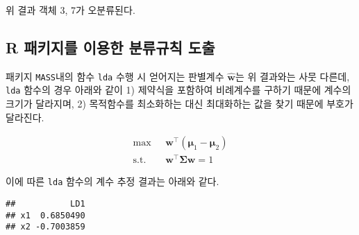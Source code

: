 \documentclass[]{book}
\newenvironment{Shaded}{\begin{snugshade}}{\end{snugshade}}
\newcommand{\KeywordTok}[1]{\textcolor[rgb]{0.13,0.29,0.53}{\textbf{#1}}}
\newcommand{\NormalTok}[1]{#1}
\newcommand{\OperatorTok}[1]{\textcolor[rgb]{0.81,0.36,0.00}{\textbf{#1}}}
\newcommand{\StringTok}[1]{\textcolor[rgb]{0.31,0.60,0.02}{#1}}
\begin{document}
위 결과 객체 3, 7가 오분류된다.

\hypertarget{r----}{%
\subsection{R 패키지를 이용한 분류규칙 도출}\label{r----}}

패키지 \texttt{MASS}내의 함수 \texttt{lda} 수행 시 얻어지는 판별계수 \(\hat{\mathbf{w}}\)는 위 결과와는 사뭇 다른데, \texttt{lda} 함수의 경우 아래와 같이 1) 제약식을 포함하여 비례계수를 구하기 때문에 계수의 크기가 달라지며, 2) 목적함수를 최소화하는 대신 최대화하는 값을 찾기 때문에 부호가 달라진다.

\begin{equation*}
\begin{split}
\max \text{  } & \mathbf{w}^\top ( \boldsymbol\mu_1 - \boldsymbol\mu_2 )\\
\text{s.t. } & \mathbf{w}^\top \boldsymbol\Sigma \mathbf{w} = 1
\end{split}
\end{equation*}

이에 따른 \texttt{lda} 함수의 계수 추정 결과는 아래와 같다.

\begin{Shaded}
\end{Shaded}

\begin{verbatim}
##           LD1
## x1  0.6850490
## x2 -0.7003859
\end{verbatim}

\begin{Shaded}
\end{Shaded}
\end{document}
